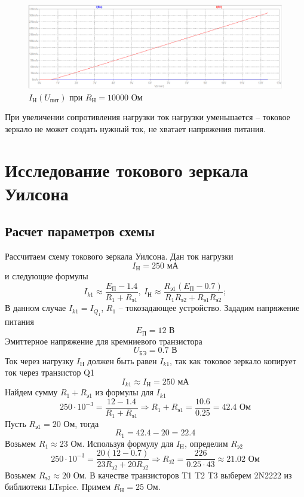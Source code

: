 \documentclass[a4paper, 12pt]{article}
\begin{document}
    \begin{figure}[H]
        \centering
        \includegraphics[scale=0.46]{1task_Iн(Vпит)_Rн10000.png}
        \captionsetup{skip=0pt}
        \caption{$I_\text{Н}\left( U_\text{пит} \right)$ при $R_\text{Н}=10000$ Ом}
        \label{fig:1task_InVlR10000}
    \end{figure}
    \noindent При увеличении сопротивления нагрузки ток нагрузки уменьшается -- токовое зеркало не может создать нужный ток,
    не хватает напряжения питания.


    \section{Исследование токового зеркала Уилсона}
    \subsection{Расчет параметров схемы}
    Рассчитаем схему токового зеркала Уилсона. Дан ток нагрузки
    $$
    I_\text{Н}=250\text{ мА}
    $$
    и следующие формулы
    $$
    I_{k1}\approx\dfrac{E_\text{П}-1.4}{R_1+R_\text{э1}},\ I_\text{Н}\approx\dfrac{R_\text{э1}\left( E_\text{П}-0.7 \right)}{R_1R_\text{э2}+R_\text{э1}R_\text{э2}};
    $$
    В данном случае $I_{k1}=I_{Q_1}$, $R_1$ -- токозадающее устройство. Зададим напряжение питания $$E_\text{П}=12\text{ В}$$
    Эмиттерное напряжение для кремниевого транзистора
    $$
    U_\text{БЭ}=0.7\text{ В}
    $$
    Ток через нагрузку $I_\text{Н}$ должен быть равен $I_{k1}$, так как токовое зеркало копирует ток через транзистор Q1
    $$
    I_{k1}\approx I_\text{Н}=250\text{ мА}
    $$
    Найдем сумму $R_1+R_\text{э1}$ из формулы для $I_{k1}$
    $$
    250\cdot10^{-3}=\dfrac{12-1.4}{R_1+R_\text{э1}}\Rightarrow R_1+R_\text{э1}=\dfrac{10.6}{0.25}=42.4\text{ Ом}
    $$
    Пусть $R_\text{э1}=20$ Ом, тогда
    $$
    R_1=42.4-20=22.4
    $$
    Возьмем $R_1\approx23$ Ом. Используя формулу для $I_\text{Н}$,
    определим $R_\text{э2}$
    $$
    250\cdot10^{-3}=\dfrac{20\left( 12-0.7 \right)}{23R_\text{э2}+20R_\text{э2}}\Rightarrow R_\text{э2}=\dfrac{226}{0.25\cdot43}\approx21.02\text{ Ом}
    $$
    Возьмем $R_\text{э2}\approx20$ Ом. В качестве транзисторов T1 T2 T3 выберем 2N2222
    из библиотеки LTspice. Примем $R_\text{Н}=25$ Ом.
\end{document}

